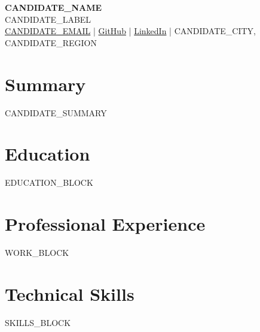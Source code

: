 \documentclass[11pt,a4paper]{article}
\begin{document}
\begin{center}
  {\Huge \textbf{CANDIDATE_NAME}} \\[4pt]
  CANDIDATE_LABEL \\[3pt]
  \small
  \href{mailto:CANDIDATE_EMAIL}{CANDIDATE_EMAIL} \quad|\quad
  \href{CANDIDATE_GITHUB_URL}{GitHub} \quad|\quad
  \href{CANDIDATE_LINKEDIN_URL}{LinkedIn} \quad|\quad
  CANDIDATE_CITY, CANDIDATE_REGION
\end{center}

\section{Summary}
CANDIDATE_SUMMARY

\section{Education}
EDUCATION_BLOCK

\section{Professional Experience}
WORK_BLOCK

\section{Technical Skills}
\begin{description}[style=sameline, labelwidth=4cm, leftmargin=4.5cm]
SKILLS_BLOCK
\end{description}
\end{document}
